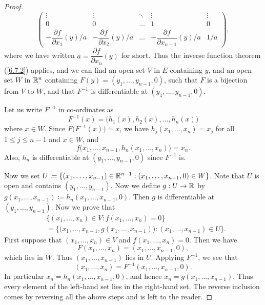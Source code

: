 \begin{proof}
\[\begin{pmatrix}
      \vdots                                   & \vdots                                   & \ddots & \vdots                                         & \vdots \\
      0                                        & 0                                        & \dots  & 1                                              & 0      \\
      -\dfrac{\partial f}{\partial x_1}(y) / a & -\dfrac{\partial f}{\partial x_2}(y) / a & \dots  & -\dfrac{\partial f}{\partial x_{n - 1}}(y) / a & 1 / a
    \end{pmatrix},
  \]
  where we have written \(a = \dfrac{\partial f}{\partial x_n}(y)\) for short.
  Thus the inverse function theorem (\cref{6.7.2}) applies, and we can find an open set \(V\) in \(E\) containing \(y\), and an open set \(W\) in \(\mathbb{R}^n\) containing \(F(y) = (y_1, \dots, y_{n - 1}, 0)\), such that \(F\) is a bijection from \(V\) to \(W\), and that \(F^{-1}\) is differentiable at \((y_1, \dots, y_{n - 1}, 0)\).

  Let us write \(F^{-1}\) in co-ordinates as
  \[
    F^{-1}(x) = \big(h_1(x), h_2(x), \dots, h_n(x)\big)
  \]
  where \(x \in W\).
  Since \(F\big(F^{-1}(x)\big) = x\), we have \(h_j(x_1, \dots, x_n) = x_j\) for all \(1 \leq j \leq n - 1\) and \(x \in W\), and
  \[
    f\big(x_1, \dots, x_{n - 1}, h_n(x_1, \dots, x_n)\big) = x_n.
  \]
  Also, \(h_n\) is differentiable at \((y_1, \dots, y_{n - 1}, 0)\) since \(F^{-1}\) is.

  Now we set \(U \coloneqq \{(x_1, \dots, x_{n - 1}) \in \mathbb{R}^{n - 1} : (x_1, \dots, x_{n - 1}, 0) \in W\}\).
  Note that \(U\) is open and contains \((y_1, \dots, y_{n - 1})\).
  Now we define \(g : U \to \mathbb{R}\) by \(g(x_1, \dots, x_{n - 1}) \coloneqq h_n(x_1, \dots, x_{n - 1}, 0)\).
  Then \(g\) is differentiable at \((y_1, \dots, y_{n - 1})\).
  Now we prove that
  \begin{align*}
     & \{(x_1, \dots, x_n) \in V : f(x_1, \dots, x_n) = 0\}                                                     \\
     & = \Big\{\big(x_1, \dots, x_{n - 1}, g(x_1, \dots, x_{n - 1})\big) : (x_1, \dots, x_{n - 1}) \in U\Big\}.
  \end{align*}
  First suppose that \((x_1, \dots, x_n) \in V\) and \(f(x_1, \dots, x_n) = 0\).
  Then we have
  \[
    F(x_1, \dots, x_n) = (x_1, \dots, x_{n - 1}, 0),
  \]
  which lies in \(W\).
  Thus \((x_1, \dots, x_{n - 1})\) lies in \(U\).
  Applying \(F^{-1}\), we see that
  \[
    (x_1, \dots, x_n) = F^{-1}(x_1, \dots, x_{n - 1}, 0).
  \]
  In particular \(x_n = h_n(x_1, \dots, x_{n - 1}, 0)\), and hence \(x_n = g(x_1, \dots, x_{n - 1})\).
  Thus every element of the left-hand set lies in the right-hand set.
  The reverse inclusion comes by reversing all the above steps and is left to the reader.


\end{proof}
